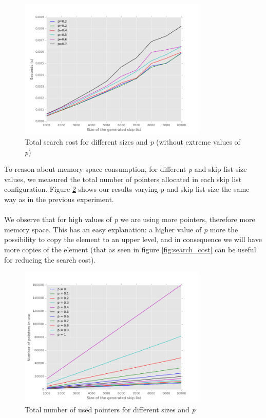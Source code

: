 \documentclass{article}
\begin{document}
\begin{figure}[H]
  \begin{center}
    \includegraphics[width=0.8\textwidth]{imgs/time2.png}
    \caption{Total search cost for different sizes and \textit{p} (without extreme values of \textit{p})}
    \label{fig:search_cost2}
  \end{center}
\end{figure}

To reason about memory space consumption, for different \textit{p} and skip list size values, we measured the total number of pointers allocated in each skip list configuration. Figure \ref{fig:num_pointers} shows our results varying p and skip list size the same way as in the previous experiment.\\
\\
We observe that for high values of \textit{p} we are using more pointers, therefore more memory space. This has an easy explanation: a higher value of \textit{p} more the possibility to copy the element to an upper level, and in consequence we will have more copies of the element (that as seen in figure \ref{fig:search_cost} can be useful for reducing the search cost).

\begin{figure}[H]
\begin{center}
    \includegraphics[width=0.8\textwidth]{imgs/pointers.png}
    \caption{Total number of used pointers for different sizes and \textit{p}}
    \label{fig:num_pointers}
  \end{center}
\end{figure}
\end{document}

